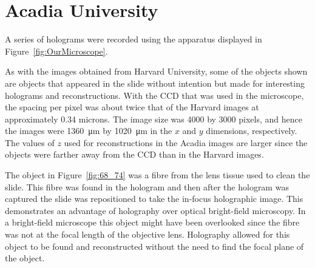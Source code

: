 %
%

\section{Acadia University}


A series of holograms were recorded using the apparatus displayed in
Figure~\ref{fig:OurMicroscope}.

As with the images obtained from Harvard University, some of the objects shown are
objects that appeared in the slide without intention but made for interesting
holograms and reconstructions. With the CCD that was used in the microscope,
the spacing per pixel was about twice that of the Harvard images at
approximately 0.34
microns. The image size was 4000 by 3000 pixels, and hence the images were
\SI{1360}{\micro\meter} by \SI{1020}{\micro\meter} in the $x$ and $y$
dimensions, respectively. The values of $z$ used for
reconstructions in the Acadia images are larger since the objects were farther
away from the CCD than in the Harvard images.

The object in Figure~\ref{fig:68_74} was a fibre from the lens tissue used to
clean the slide. This fibre was found in the hologram and then after the
hologram was captured the slide was repositioned to take the in-focus
holographic image.
This demonstrates an advantage of holography over optical bright-field
microscopy. In a bright-field microscope this object might have been
overlooked since the fibre was not at the focal length of the objective lens. Holography allowed for
this object to be found and reconstructed without the need to find the focal
plane of the object. 

